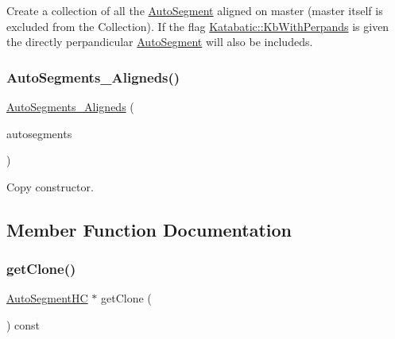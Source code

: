 Create a collection of all the \mbox{\hyperlink{classKatabatic_1_1AutoSegment}{Auto\+Segment}} aligned on {\ttfamily master} (master itself is excluded from the Collection). If the flag \mbox{\hyperlink{namespaceKatabatic_a2af2ad6b6441614038caf59d04b3b217ae2d033c8f78b61468c827de8db5fe839}{Katabatic\+::\+Kb\+With\+Perpands}} is given the directly perpandicular \mbox{\hyperlink{classKatabatic_1_1AutoSegment}{Auto\+Segment}} will also be includeds. \mbox{\label{classKatabatic_1_1AutoSegments__Aligneds_aade683d2c99dc069e2cd5c8b942f8912}} 
\subsubsection{\texorpdfstring{Auto\+Segments\+\_\+\+Aligneds()}{AutoSegments\_Aligneds()}\hspace{0.1cm}{\footnotesize\ttfamily [2/2]}}
{\footnotesize\ttfamily \mbox{\hyperlink{classKatabatic_1_1AutoSegments__Aligneds}{Auto\+Segments\+\_\+\+Aligneds}} (\begin{DoxyParamCaption}\item[{const \mbox{\hyperlink{classKatabatic_1_1AutoSegments__Aligneds}{Auto\+Segments\+\_\+\+Aligneds}} \&}]{autosegments }\end{DoxyParamCaption})\hspace{0.3cm}{\ttfamily [inline]}}

Copy constructor. 

\subsection{Member Function Documentation}
\mbox{\label{classKatabatic_1_1AutoSegments__Aligneds_a5b26b0698bdcb40cbf51b250dfb21858}} 
\subsubsection{\texorpdfstring{get\+Clone()}{getClone()}}
{\footnotesize\ttfamily \mbox{\hyperlink{namespaceKatabatic_acb3628dc7705fefe38a665cfe43efa6e}{Auto\+Segment\+HC}} $\ast$ get\+Clone (\begin{DoxyParamCaption}{ }\end{DoxyParamCaption}) const\hspace{0.3cm}{\ttfamily [virtual]}}

